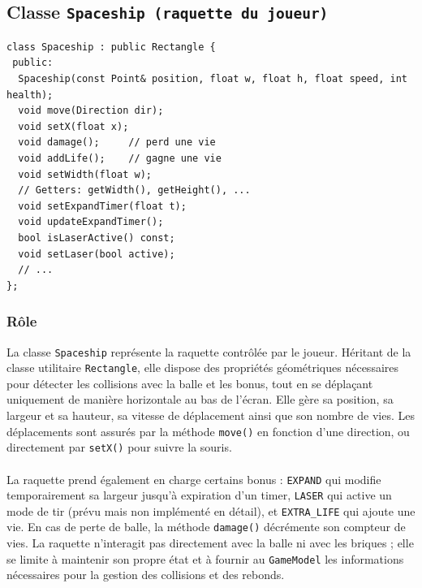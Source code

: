 \documentclass[12pt]{article}
\begin{document}



\subsection{Classe \texttt{Spaceship (raquette du joueur)}}

\begin{lstlisting}
class Spaceship : public Rectangle {
 public:
  Spaceship(const Point& position, float w, float h, float speed, int health);
  void move(Direction dir);
  void setX(float x);
  void damage();     // perd une vie
  void addLife();    // gagne une vie
  void setWidth(float w);
  // Getters: getWidth(), getHeight(), ...
  void setExpandTimer(float t);
  void updateExpandTimer();
  bool isLaserActive() const;
  void setLaser(bool active);
  // ...
};

\end{lstlisting}

\subsubsection* {Rôle}
La classe \colorbox{gray!20}{\texttt{Spaceship}} représente la raquette contrôlée par le joueur. Héritant de la classe utilitaire \colorbox{gray!20}{\texttt{Rectangle}}, elle dispose des propriétés géométriques nécessaires pour détecter les collisions avec la balle et les bonus, tout en se déplaçant uniquement de manière horizontale au bas de l’écran. Elle gère sa position, sa largeur et sa hauteur, sa vitesse de déplacement ainsi que son nombre de vies. Les déplacements sont assurés par la méthode \colorbox{gray!20}{\texttt{move()}} en fonction d’une direction, ou directement par \colorbox{gray!20}{\texttt{setX()}} pour suivre la souris. 
\paragraph{}
La raquette prend également en charge certains bonus : \colorbox{gray!20}{\texttt{EXPAND}} qui modifie temporairement sa largeur jusqu’à expiration d’un timer, \colorbox{gray!20}{\texttt{LASER}} qui active un mode de tir (prévu mais non implémenté en détail), et \colorbox{gray!20}{\texttt{EXTRA\_LIFE}} qui ajoute une vie. En cas de perte de balle, la méthode \colorbox{gray!20}{\texttt{damage()}} décrémente son compteur de vies. La raquette n’interagit pas directement avec la balle ni avec les briques ; elle se limite à maintenir son propre état et à fournir au \colorbox{gray!20}{\texttt{GameModel}} les informations nécessaires pour la gestion des collisions et des rebonds.
\end{document}
